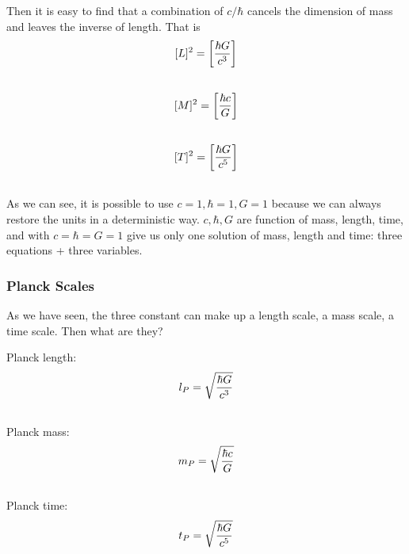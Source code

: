 \documentclass[letterpaper,10pt,english]{sphinxmanual}
\begin{document}
Then it is easy to find that a combination of $c/\hbar$ cancels the dimension of mass and leaves the inverse of length. That is
\begin{gather}
\begin{split}[ L ]^2 =\left[ \frac{\hbar G}{c^3} \right]\end{split}\notag\\\begin{split}\end{split}\notag
\end{gather}\begin{gather}
\begin{split}[ M ]^2 = \left [ \frac{\hbar c}{ G } \right]\end{split}\notag\\\begin{split}\end{split}\notag
\end{gather}\begin{gather}
\begin{split}[T]^2 = \left[ \frac{ \hbar G }{ c^5 }  \right]\end{split}\notag\\\begin{split}\end{split}\notag
\end{gather}
As we can see, it is possible to use $c=1, \hbar = 1, G =1$ because we can always restore the units in a deterministic way. $c, \hbar, G$ are function of mass, length, time, and with $c = \hbar = G=1$ give us only one solution of mass, length and time: three equations + three variables.


\subsubsection{Planck Scales}
\label{Basic:planck-scales}
As we have seen, the three constant can make up a length scale, a mass scale, a time scale. Then what are they?

Planck length:
\begin{gather}
\begin{split}l_P = \sqrt{ \frac{ \hbar G }{ c^3 } }\end{split}\notag\\\begin{split}\end{split}\notag
\end{gather}
Planck mass:
\begin{gather}
\begin{split}m_P = \sqrt{ \frac{ \hbar c }{ G } }\end{split}\notag\\\begin{split}\end{split}\notag
\end{gather}
Planck time:
\begin{gather}
\begin{split}t_P = \sqrt{ \frac{\hbar G}{ c^5 } }\end{split}\notag\\\begin{split}\end{split}\notag
\end{gather}
\end{document}
